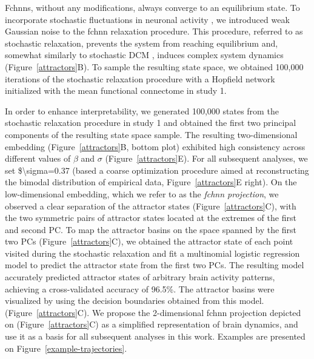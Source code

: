 \documentclass{article}
\begin{document}
Fc\acrshort{hnn}s, without any modifications, always converge to an equilibrium state.
To incorporate stochastic fluctuations in neuronal activity \citep{robinson2005multiscale}, we introduced weak
Gaussian noise to the \acrshort{fchnn} relaxation procedure. This procedure, referred to as stochastic relaxation, prevents the system from reaching equilibrium and, somewhat similarly to stochastic DCM \citep{daunizeau2012stochastic}, induces complex system dynamics (Figure~\ref{attractors}B). To sample the resulting state space, we obtained 100,000 iterations of the stochastic relaxation procedure with a Hopfield network initialized with the mean functional connectome in study 1.

In order to enhance interpretability, we generated 100,000 states from the stochastic relaxation procedure in study 1 and obtained the first two principal components of the resulting state space sample.
The resulting two-dimensional embedding (Figure~\ref{attractors}B, bottom plot) exhibited high consistency across different values of $\beta$ and $\sigma$ (Figure~\ref{attractors}E).
For all subsequent analyses, we set \${\textbackslash}sigma=0.37 (based a coarse optimization procedure aimed at reconstructing the bimodal distribution of empirical data, Figure~\ref{attractors}E right). On the low-dimensional embedding, which we refer to as the \textit{\acrshort{fchnn} projection}, we observed a clear separation of the attractor states (Figure~\ref{attractors}C), with the two symmetric pairs of attractor states located at the extremes of the first and second PC.
To map the attractor basins on the space spanned by the first two PCs (Figure~\ref{attractors}C), we obtained the attractor state of each point visited during the stochastic relaxation and fit a multinomial logistic regression model to predict the attractor state from the first two PCs.
The resulting model accurately predicted attractor states of arbitrary brain activity patterns, achieving a cross-validated accuracy of 96.5\%.
The attractor basins were visualized by using the decision boundaries obtained from this model. (Figure~\ref{attractors}C). We propose the 2-dimensional \acrshort{fchnn} projection depicted on (Figure~\ref{attractors}C) as a simplified representation of brain dynamics, and use it as a basis for all subsequent analyses in this work. Examples are presented on Figure~\ref{example-trajectories}.
\end{document}

